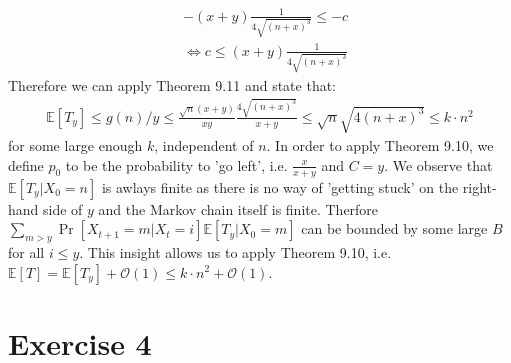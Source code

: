 \documentclass[a4paper,german]{article}
\newcommand{\E}{\mathbb{E}}
\begin{document}
	\begin{align*}
		&-(x + y)\frac{1}{4\sqrt{(n+x)^3}} \leq -c \\
		&\Leftrightarrow c \leq (x + y)\frac{1}{4\sqrt{(n+x)^3}}
	\end{align*}
	Therefore we can apply Theorem 9.11 and state that:
	\begin{align*}
		\E[T_y] \leq g(n)/y \leq \frac{\sqrt n (x+y)}{xy} \frac{4 \sqrt{(n+x)^3}}{x+y} \leq \sqrt n \sqrt{4(n+x)^3} \leq k \cdot n^2 
	\end{align*}
	for some large enough \(k\), independent of \(n\). In order to apply Theorem 9.10, we define \(p_0\) to be the probability to 'go left', i.e. \(\frac{x}{x+y}\) and \(C = y\). We observe that \(\E[T_y | X_0 =n]\) is awlays finite as there is no way of 'getting stuck' on the right-hand side of \(y\) and the Markov chain itself is finite. Therfore 
	\(\sum_{m > y} \Pr[X_{t+1} = m| X_t = i]\E[T_y|X_0 = m]\) can be bounded by some large \(B\) for all \(i \leq y\). This insight allows us to apply Theorem 9.10, i.e. \(\E[T] = \E[T_y] + \mathcal{O}(1) \leq k \cdot n^2 + \mathcal{O}(1)\).
\section*{Exercise 4}
\end{document}

